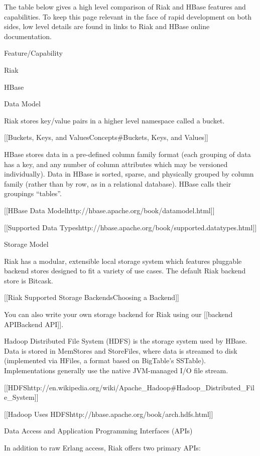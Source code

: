 \documentclass[letter]{book}
\newcounter{tab}[chapter]
\begin{document}
The table below gives a high level comparison of Riak and HBase features and capabilities. To keep this page relevant in the face of rapid development on both sides, low level details are found in links to Riak and HBase online documentation.

Feature/Capability

Riak

HBase

Data Model

Riak stores key/value pairs in a higher level namespace called a bucket.

{[}{[}Buckets, Keys, and Values\textbar{}Concepts\#Buckets, Keys, and Values{]}{]}

HBase stores data in a pre-defined column family format (each grouping of data has a key, and any number of column attributes which may be versioned individually). Data in HBase is sorted, sparse, and physically grouped by column family (rather than by row, as in a relational database). HBase calls their groupings “tables”.

{[}{[}HBase Data Model\textbar{}http://hbase.apache.org/book/datamodel.html{]}{]}

{[}{[}Supported Data Types\textbar{}http://hbase.apache.org/book/supported.datatypes.html{]}{]}

Storage Model

Riak has a modular, extensible local storage system which features pluggable backend stores designed to fit a variety of use cases. The default Riak backend store is Bitcask.

{[}{[}Riak Supported Storage Backends\textbar{}Choosing a Backend{]}{]}

You can also write your own storage backend for Riak using our {[}{[}backend API\textbar{}Backend API{]}{]}.

Hadoop Distributed File System (HDFS) is the storage system used by HBase. Data is stored in MemStores and StoreFiles, where data is streamed to disk (implemented via HFiles, a format based on BigTable's SSTable). Implementations generally use the native JVM-managed I/O file stream.

{[}{[}HDFS\textbar{}http://en.wikipedia.org/wiki/Apache\_Hadoop\#Hadoop\_Distributed\_File\_System{]}{]}

{[}{[}Hadoop Uses HDFS\textbar{}http://hbase.apache.org/book/arch.hdfs.html{]}{]}

Data Access and Application Programming Interfaces (APIs)

In addition to raw Erlang access, Riak offers two primary APIs:
\end{document}
